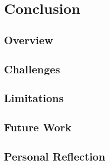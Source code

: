 \chapter{Conclusion }
\label{chapter7}

\section{Overview}

\section{Challenges}

\section{Limitations}

\section{Future Work}

\section{Personal Reflection}